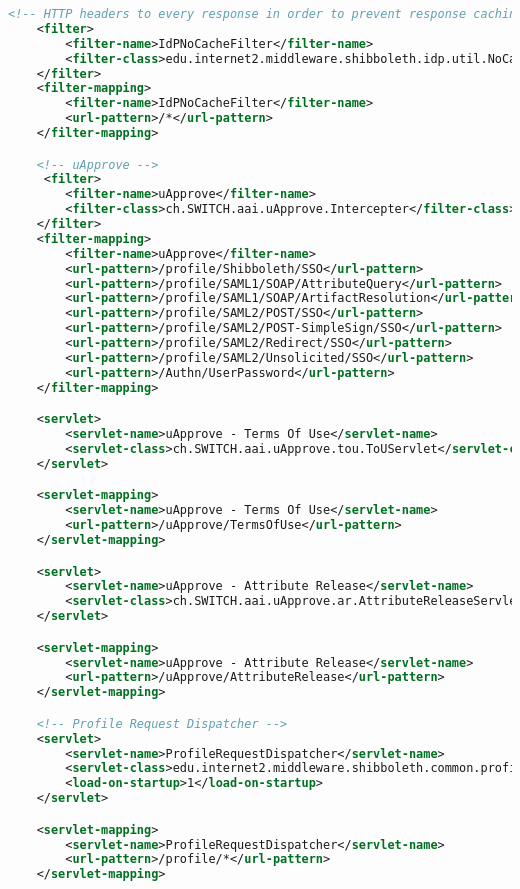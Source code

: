 \begin{lstlisting}[language=xml]
    <!-- HTTP headers to every response in order to prevent response caching -->
    <filter>
        <filter-name>IdPNoCacheFilter</filter-name>
        <filter-class>edu.internet2.middleware.shibboleth.idp.util.NoCacheFilter</filter-class>
    </filter>
    <filter-mapping>
        <filter-name>IdPNoCacheFilter</filter-name>
        <url-pattern>/*</url-pattern>
    </filter-mapping>

    <!-- uApprove -->
     <filter>
        <filter-name>uApprove</filter-name>
        <filter-class>ch.SWITCH.aai.uApprove.Intercepter</filter-class>
    </filter>
    <filter-mapping>
        <filter-name>uApprove</filter-name>
        <url-pattern>/profile/Shibboleth/SSO</url-pattern>
        <url-pattern>/profile/SAML1/SOAP/AttributeQuery</url-pattern>
        <url-pattern>/profile/SAML1/SOAP/ArtifactResolution</url-pattern>
        <url-pattern>/profile/SAML2/POST/SSO</url-pattern>
        <url-pattern>/profile/SAML2/POST-SimpleSign/SSO</url-pattern>
        <url-pattern>/profile/SAML2/Redirect/SSO</url-pattern>
        <url-pattern>/profile/SAML2/Unsolicited/SSO</url-pattern>
        <url-pattern>/Authn/UserPassword</url-pattern>
    </filter-mapping>

    <servlet>
        <servlet-name>uApprove - Terms Of Use</servlet-name>
        <servlet-class>ch.SWITCH.aai.uApprove.tou.ToUServlet</servlet-class>
    </servlet>

    <servlet-mapping>
        <servlet-name>uApprove - Terms Of Use</servlet-name>
        <url-pattern>/uApprove/TermsOfUse</url-pattern>
    </servlet-mapping>

    <servlet>
        <servlet-name>uApprove - Attribute Release</servlet-name>
        <servlet-class>ch.SWITCH.aai.uApprove.ar.AttributeReleaseServlet</servlet-class>
    </servlet>

    <servlet-mapping>
        <servlet-name>uApprove - Attribute Release</servlet-name>
        <url-pattern>/uApprove/AttributeRelease</url-pattern>
    </servlet-mapping>

    <!-- Profile Request Dispatcher -->
    <servlet>
        <servlet-name>ProfileRequestDispatcher</servlet-name>
        <servlet-class>edu.internet2.middleware.shibboleth.common.profile.ProfileRequestDispatcherServlet</servlet-class>
        <load-on-startup>1</load-on-startup>
    </servlet>

    <servlet-mapping>
        <servlet-name>ProfileRequestDispatcher</servlet-name>
        <url-pattern>/profile/*</url-pattern>
    </servlet-mapping>


\end{lstlisting}
